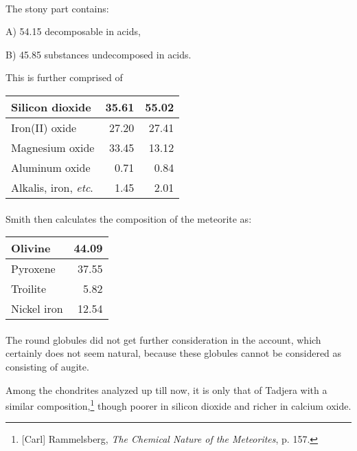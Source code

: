 \documentclass[a4paper, 12pt, oneside]{article}
\begin{document}
\paragraph*{}
The stony part contains:

A) 54.15 decomposable in acids,

B) 45.85 substances undecomposed in acids.

This is further comprised of
\begin{center}
    \begin{tabular}{ |l|r|r| } 
    \hline
    Silicon dioxide & 35.61 & 55.02\\\hline
    Iron(II) oxide & 27.20 & 27.41\\\hline
    Magnesium oxide & 33.45 & 13.12\\\hline
    Aluminum oxide & 0.71 & 0.84\\\hline
    Alkalis, iron, \emph{etc}. & 1.45 & 2.01\\
    \hline
    \end{tabular}
\end{center}
\paragraph*{}
Smith then calculates the composition of the meteorite as:
\begin{center}
    \begin{tabular}{ |l|r| } 
    \hline
    Olivine & 44.09\\\hline
    Pyroxene & 37.55\\\hline
    Troilite & 5.82\\\hline
    Nickel iron & 12.54\\
    \hline
    \end{tabular}
\end{center}
\paragraph*{}
The round globules did not get further consideration in the account, which certainly does not seem natural, because these globules cannot be considered as consisting of augite.

Among the chondrites analyzed up till now, it is only that of Tadjera with a similar composition,\footnote{[Carl] Rammelsberg, \emph{The Chemical Nature of the Meteorites}, p. 157.} though poorer in silicon dioxide and richer in calcium oxide.
\end{document}
